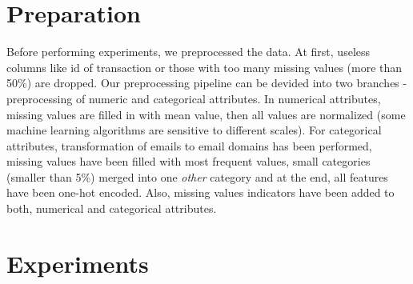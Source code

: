 \documentclass[runningheads]{llncs}
\begin{document}




\section{Preparation}

Before performing experiments, we preprocessed the data. At first, useless columns like id of transaction or those with too many missing values (more than 50\%) are dropped. Our preprocessing pipeline can be devided into two branches - preprocessing of numeric and categorical attributes. In numerical attributes, missing values are filled in with mean value, then all values are normalized (some machine learning algorithms are sensitive to different scales). For categorical attributes, transformation of emails to email domains has been performed, missing values have been filled with most frequent values, small categories (smaller than 5\%) merged into one \textit{other} category and at the end, all features have been one-hot encoded. Also, missing values indicators have been added to both, numerical and categorical attributes.



\section{Experiments}
\end{document}
